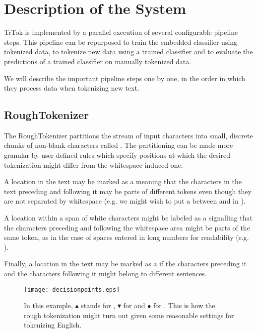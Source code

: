 \section{Description of the System}
\label{sec:system}

TrTok is implemented by a parallel execution of several configurable
pipeline steps. This pipeline can be repurposed to train the embedded
classifier using tokenized data, to tokenize new data using a trained
classifier and to evaluate the predictions of a trained classifier on
manually tokenized data.

We will describe the important pipeline steps one by one, in the order
in which they process data when tokenizing new text.

\subsection{RoughTokenizer}

The RoughTokenizer partitions the stream of input characters into
small, discrete chunks of non-blank characters called . The partitioning can be made more granular by user-defined
rules which specify positions at which the desired tokenization might
differ from the whitespace-induced one.

A location in the text may be marked as a \maysplit{} meaning that the
characters in the text preceding and following it may be parts of
different tokens even though they are not separated by whitespace
(e.g. we might wish to put a \maysplit{} between  and
 in ).

A location within a span of white characters might be labeled as a
\mayjoin{} signalling that the characters preceding and following the
whitespace area might be parts of the same token, as in the case of
spaces entered in long numbers for readability (e.g.
).

Finally, a location in the text may be marked as a \maybreaksentence{}
if the characters preceding it and the characters following it might
belong to different sentences.

\begin{figure}
  \begin{center}
    \texttt{[image: decisionpoints.eps]}
    \caption{In this example, $\blacktriangle$ stands for \maysplit{},
      $\blacktriangledown$ for \mayjoin{} and $\bullet$ for
      \maybreaksentence{}. This is how the rough tokenization might
      turn out given some reasonable settings for tokenizing English.}
    \label{fig:decision-points}
  \end{center}
\end{figure}

